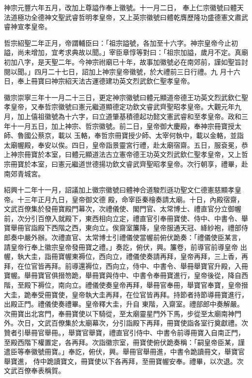 \begin{pinyinscope}
 神宗元豐六年五月，改加上尊謚作奉上徽號。十一月二日，
 奉上仁宗徽號曰體天法道極功全德神文聖武睿哲明孝皇帝，又上英宗徽號曰體乾膺歷隆功盛德憲文肅武睿神宣孝皇帝。



 哲宗紹聖二年正月，帝謂輔臣曰：「祖宗謚號，各加至十六字。神宗皇帝今止初謚，尚未增加，宜考求典故以聞。」宰臣章惇等對曰：「祖宗加謚，歲月不定。真廟初加八字，是天聖二年。今神宗祔廟已十年，故事加徽號必在南郊前，謹如聖旨討閱以聞。」四月二十七日，詔加上神宗皇帝徽號，於大禮前三日行禮。九
 月十六日，奉上冊寶曰神宗紹天法古運德建功英文烈武欽仁聖孝皇帝。



 徽宗崇寧三年十一月二十三日，更定神宗徽號曰體元顯道帝德王功英文烈武欽仁聖孝皇帝，又奉哲宗徽號曰憲元繼道顯德定功欽文睿武齊聖昭孝皇帝。大觀元年九月，加上僖祖徽號為十六字，曰立道肇基積德起功懿文憲武睿和至孝皇帝。政和三年十一月五日，加上神宗、哲宗徽號。前二日，皇帝御大慶殿，奉神宗冊寶授太師、魯國公蔡京，載以
 玉輅，奉哲宗冊寶授少師、太宰何執中，載以金輅，並詣太廟幄殿，奉安以俟。四日，皇帝詣景靈宮行禮，赴太廟宿齋。五日，服袞冕，恭上神宗冊寶於本室，曰體元顯道法古立憲帝德王功英文烈武欽仁聖孝皇帝，又上哲宗冊寶於本室，曰憲元繼道世德揚功欽文睿武齊聖昭孝皇帝。次行朝享，禮畢，赴南郊青城宮。



 紹興十二年十一月，詔議加上徽宗徽號曰體神合道駿烈遜功聖文仁德憲慈顯孝皇帝。十三年正月九日，皇帝御文德
 殿，命宰臣秦檜奏請太廟。十日，內殿宿齋，文武百僚集於發冊寶殿門幕次，次禮儀使、閣門官、太常博士、禮直官分立御幄前，次分引百僚入就殿下，東西相向立定，禮直官引奉冊寶使、侍中、中書令、舉寶舉冊官詣殿下西階之西，東向立。俟齋室簾降，皇帝服通天冠、絳紗袍，禮部侍郎奏中嚴外辦。次禮直官、太常博士引禮儀使當幄前俯伏跪奏：「禮儀使臣某言，請皇帝行奉上徽宗皇帝發冊寶之禮。」奏訖，俯伏，興。簾卷，前導官前導皇帝
 出幄，執大圭，詣冊寶幄東褥位，西向立，禮儀使奏請再拜，皇帝再拜，三上香，再拜，在位官皆再拜。前導還褥位，西向立，侍中、中書令、舉冊舉寶官升殿，入冊寶幄。舉冊寶官俱搢笏跪，舉冊寶與侍中、中書令奉冊寶進行，皇帝後從，降自西階，至殿下褥位，南向立。禮儀使奏皇帝再拜，舉冊官奉冊，舉寶官奉寶，皇帝搢大圭，跪奉受冊寶使，皇帝執大圭再拜，在位官皆再拜。持節者持節導冊寶進行，出殿正門。禮儀使奏禮畢。皇帝釋大圭，升自
 東階，入齋室。禮部郎中奏解嚴。次冊寶出北宮門，奉冊寶使以下騎從，至太廟靈星門外下馬，步從至太廟南神門外。次日，文武百僚集於太廟幕次，分引詣殿下再拜，冊寶使詣各室行奠獻禮。次贊者引舉冊官舉冊。，舉寶官舉寶，禮直官引侍中、中書令前導冊寶入自南正門，至殿西階下權置定，各再拜。次詣徽宗室，冊寶使俯伏跪奏稱：「嗣皇帝臣某，謹遣臣等奉徽號冊寶。」奉訖，俯伏，興。舉冊官舉冊進，中書令跪讀冊文，舉寶官舉寶進，
 侍中跪讀寶文，冊寶使以下各再拜，至冊寶幄安奉。禮畢，以次退。次文武百僚奉表稱賀。




\end{pinyinscope}
